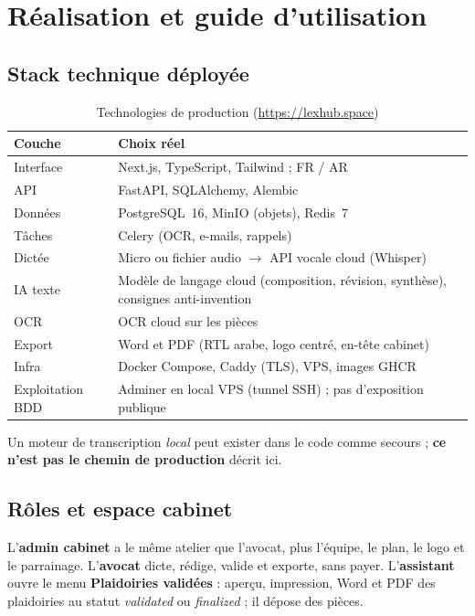 \chapter{Réalisation et guide d'utilisation}
\label{ch:realisation}

\section{Stack technique déployée}

\begin{table}[H]
\centering
\caption{Technologies de production (\url{https://lexhub.space})}
\label{tab:stack}
\begin{tabular}{@{}ll@{}}
\toprule
\textbf{Couche} & \textbf{Choix réel} \\
\midrule
Interface & Next.js, TypeScript, Tailwind ; FR / AR \\
API & FastAPI, SQLAlchemy, Alembic \\
Données & PostgreSQL~16, MinIO (objets), Redis~7 \\
Tâches & Celery (OCR, e-mails, rappels) \\
Dictée & Micro ou fichier audio $\rightarrow$ API vocale cloud (Whisper) \\
IA texte & Modèle de langage cloud (composition, révision, synthèse), consignes anti-invention \\
OCR & OCR cloud sur les pièces \\
Export & Word et PDF (RTL arabe, logo centré, en-tête cabinet) \\
Infra & Docker Compose, Caddy (TLS), VPS, images GHCR \\
Exploitation BDD & Adminer en local VPS (tunnel SSH) ; pas d'exposition publique \\
\bottomrule
\end{tabular}
\end{table}

Un moteur de transcription \emph{local} peut exister dans le code comme secours ; \textbf{ce n'est pas le chemin de production} décrit ici.

\section{Rôles et espace cabinet}

L'\textbf{admin cabinet} a le même atelier que l'avocat, plus l'équipe, le plan, le logo et le parrainage. L'\textbf{avocat} dicte, rédige, valide et exporte, sans payer. L'\textbf{assistant} ouvre le menu \textbf{Plaidoiries validées} : aperçu, impression, Word et PDF des plaidoiries au statut \textit{validated} ou \textit{finalized} ; il dépose des pièces.

